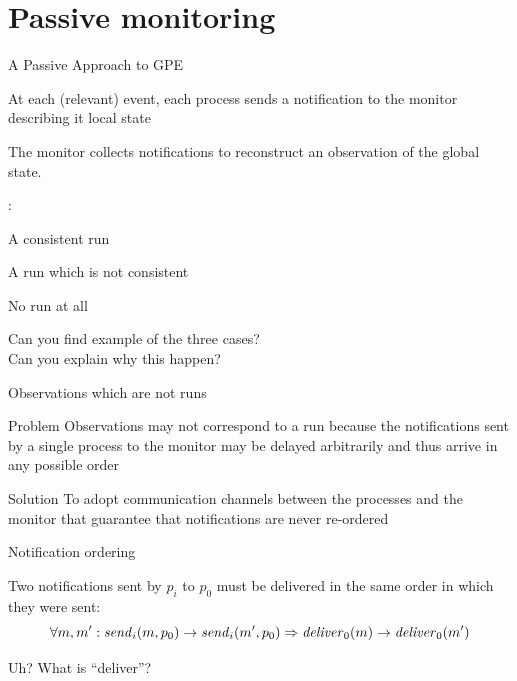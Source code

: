 \section{Passive monitoring}

\begin{frame}{A Passive Approach to GPE}

\BI
\item At each (relevant) event, each process sends a \alert{notification} to the 
  monitor describing it local state
\item The monitor collects \alert{notifications} to reconstruct an observation of the global state.
\EI

\bigskip
{}:
\BI
\item A consistent run
\item A run which is not consistent
\item No run at all
\EI

\bigskip
Can you find example of the three cases?\\
Can you explain why this happen?
\end{frame}


\begin{frame}{Observations which are not runs}

\begin{block}{Problem} 
Observations may not correspond to a run because the notifications sent
by a single process to the monitor may be delayed arbitrarily and thus 
arrive in any possible order
\end{block}

\pause
\bigskip
\begin{block}{Solution}
To adopt communication channels between the processes and the monitor that 
guarantee that notifications are never re-ordered
\end{block}

\end{frame}

\begin{frame}{Notification ordering}
\begin{definition}
Two notifications sent by $p_i$ to $p_0$ must be delivered in the
same order in which they were sent:
\[
\forall m,m': \mathit{send}_i(m,p_0) \rightarrow \mathit{send}_i(m',p_0) \Rightarrow \mathit{deliver}_0(m) \rightarrow \mathit{deliver}_0(m')
\]
\end{definition}

\bigskip
Uh? What is ``deliver''?

\end{frame}

